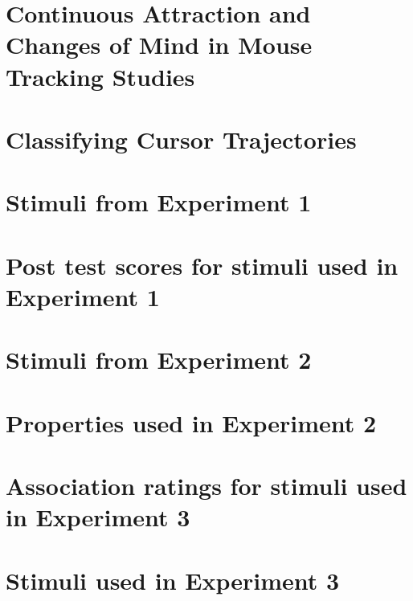 \documentclass{Dissertate}
\begin{document}
\begin{appendices}
  \appendixpage
  \graphicspath{{Appendices/}}
  
  \chapter{Continuous Attraction and Changes of Mind in Mouse Tracking Studies}\label{appendix:mouse-studies}
  
  

  \chapter{Classifying Cursor Trajectories}\label{appendix:reversals}
  
  
  \chapter{Stimuli from Experiment 1}\label{appendix:exp1_stimuli}
  
  \chapter{Post test scores for stimuli used in Experiment 1} \label{appendix:exp1_posttest}
  

  \chapter{Stimuli from Experiment 2}\label{appendix:exp2_stimuli}
  
  \chapter{Properties used in Experiment 2}\label{appendix:exp2_properties}
  

  \chapter{Association ratings for stimuli used in Experiment 3}\label{appendix:exp3_associations}
  
  \chapter{Stimuli used in Experiment 3}\label{appendix:exp3_stimuli}
  

\end{appendices}
\end{document}
